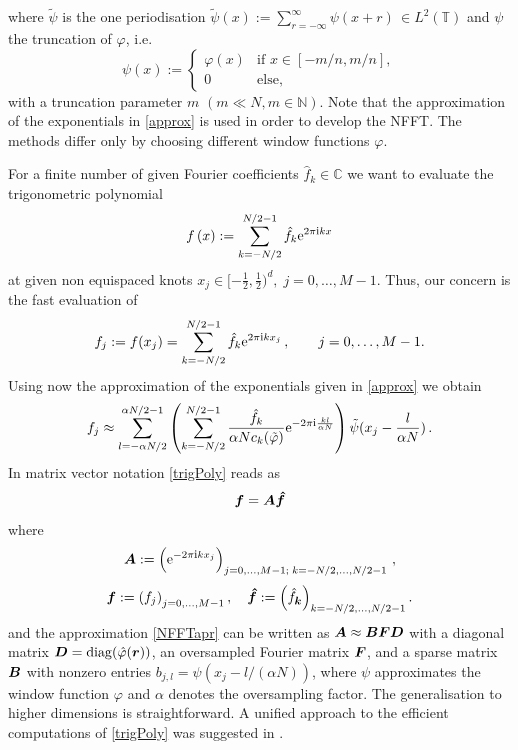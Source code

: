 \documentclass[journal]{IEEEtran}
\def\ti{\mbox{\scriptsize{\rm i}}}
\newcommand{\eip}[1]{{\rm e}^{ 2\pi{\ti} #1}}
\newcommand{\eim}[1]{{\rm e}^{-2\pi{\ti} #1}}
\newcommand{\zb}[1]{\mbox{\boldmath{${#1}$}}}
\newcommand{\zbs}[1]{\mbox{\boldmath\scriptsize{${#1}$}}}
\newcommand{\diag}{{\rm diag}}
\numberwithin{equation}{section}
\numberwithin{table}{section}
\numberwithin{figure}{section}
\begin{document}
where $\tilde\psi$ is the one periodisation 
$
\displaystyle\tilde\psi(x) := \sum_{r=-\infty}^{\infty} \psi(x +r)\,
\in L^2(\mathbb{T})
$
and $\psi$ the truncation of $\varphi$, i.e.
\begin{equation}\label{Defpsi}
\psi(x) := \left\{
\begin{array}{ll}
\varphi(x) & \textrm{if }  x \in [- m/n,m/n], \\
0 & \textrm{else},
\end{array} \right.
\end{equation}
with a truncation parameter $m$ $(m\ll N,m\in \mathbb{N})$. 
Note that the approximation of the exponentials in \eqref{approx} is
used in order to develop the NFFT. The methods differ only by choosing
different window functions $\varphi$. 

For a finite number of  
given Fourier coefficients $\hat f_{k} \in \mathbb{C}$
we want to
evaluate the trigonometric polynomial  
\begin{equation}
 \label{trigPoly}
  f\left( x\right) := \sum_{k=-N/2}^{N/2-1} \hat{f}_{k} \eip{ k x}
\end{equation}
at given non equispaced knots $ x_j \in
[-\frac{1}{2},\frac{1}{2})^d,\;j=0,\hdots,M-1$. 
Thus, our concern is the fast evaluation of
\begin{equation*}
 f_j :=f(x_j) = \sum_{k=-N/2}^{N/2-1} \hat{f}_{k} \eip{k x_j}\,, \qquad
 j=0,\hdots,M-1. 
\end{equation*}
Using now the approximation of the exponentials given in \eqref{approx}
we obtain
\begin{equation}
 \label{NFFTapr}
f_j \approx\sum_{l=-\alpha N/2}^{\alpha N/2-1}\left(
\sum_{ k=-N/2}^{N/2-1} \frac{\hat{f}_{k}}{\alpha N c_{k} (\tilde \varphi )}
\eim{\frac{kl}{\alpha N}}
\right)\tilde\psi (x_j-\frac{l}{\alpha N})  \, .
\end{equation}
In matrix vector notation \eqref{trigPoly} reads as
\begin{equation}
 \label{ndft}
 \zb f=\zb A \zb {\hat f}
\end{equation}
where 
\begin{equation*}
\zb A:=\left(\eim{k x_j}\right)_{j=0,\hdots,M-1;\;k=-N/2,\ldots,N/2-1}\, ,
\end{equation*}
\begin{equation*}
\zb f:=\left(f_j\right)_{j=0,\hdots,M-1},\quad 
\zb {\hat f}:=\left(\hat{f}_{\zbs k}\right)_{k=-N/2,\ldots,N/2-1}.
\end{equation*}
and the approximation \eqref{NFFTapr} 
can be written as 
$\zb A \approx \zb B \zb F \zb D$ with a diagonal matrix $\zb
D=\diag(\hat \varphi(\zb r))$,
an oversampled Fourier matrix $\zb F$, and
a sparse matrix $\zb B$
with nonzero entries $b_{j,l}=\psi (x_j - l/ (\alpha N))$, where
$\psi$ approximates the window  function $\varphi$ and $\alpha$
denotes the oversampling factor. The generalisation to higher
dimensions is straightforward. A unified approach to the
efficient computations of \eqref{trigPoly} was suggested in \cite{st97,
  postta01}. 
\end{document}
